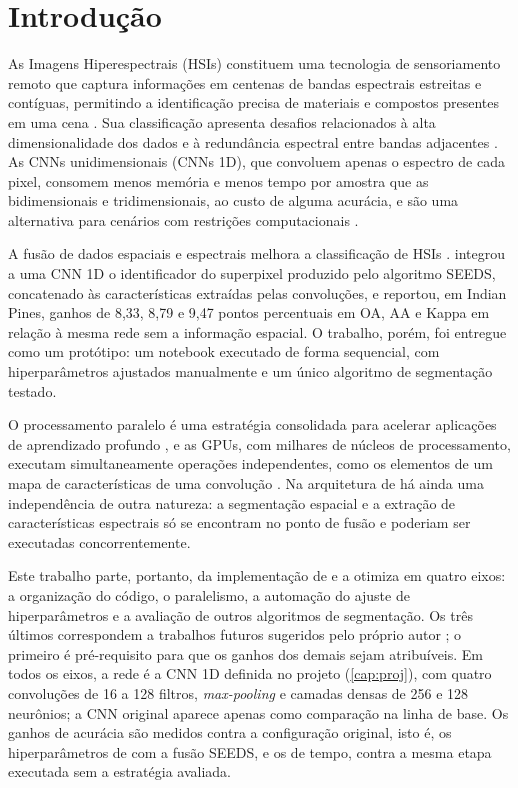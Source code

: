 \chapter{Introdução}
\label{cap:intro}

As Imagens Hiperespectrais (HSIs) constituem uma tecnologia de sensoriamento remoto que captura informações em centenas de bandas espectrais estreitas e contíguas, permitindo a identificação precisa de materiais e compostos presentes em uma cena \cite{Li2019DeepLF, Ahmad_2025}. Sua classificação apresenta desafios relacionados à alta dimensionalidade dos dados e à redundância espectral entre bandas adjacentes \cite{Qian2020, Lurs12162659}. As CNNs unidimensionais (CNNs 1D), que convoluem apenas o espectro de cada pixel, consomem menos memória e menos tempo por amostra que as bidimensionais e tridimensionais, ao custo de alguma acurácia, e são uma alternativa para cenários com restrições computacionais \cite{Viel10064297}.

A fusão de dados espaciais e espectrais melhora a classificação de HSIs \cite{IMANI202059, Souza2023}.  integrou a uma CNN 1D o identificador do superpixel produzido pelo algoritmo SEEDS, concatenado às características extraídas pelas convoluções, e reportou, em Indian Pines, ganhos de 8,33, 8,79 e 9,47 pontos percentuais em OA, AA e Kappa em relação à mesma rede sem a informação espacial. O trabalho, porém, foi entregue como um protótipo: um notebook executado de forma sequencial, com hiperparâmetros ajustados manualmente e um único algoritmo de segmentação testado.

O processamento paralelo é uma estratégia consolidada para acelerar aplicações de aprendizado profundo \cite{Aach2025, Nandan10910577}, e as GPUs, com milhares de núcleos de processamento, executam simultaneamente operações independentes, como os elementos de um mapa de características de uma convolução \cite{CUDA_Programming, Jorda_cuDNN}. Na arquitetura de  há ainda uma independência de outra natureza: a segmentação espacial e a extração de características espectrais só se encontram no ponto de fusão e poderiam ser executadas concorrentemente.

Este trabalho parte, portanto, da implementação de  e a otimiza em quatro eixos: a organização do código, o paralelismo, a automação do ajuste de hiperparâmetros e a avaliação de outros algoritmos de segmentação. Os três últimos correspondem a trabalhos futuros sugeridos pelo próprio autor \cite{Souza2023}; o primeiro é pré-requisito para que os ganhos dos demais sejam atribuíveis. Em todos os eixos, a rede é a CNN 1D definida no projeto (\autoref{cap:proj}), com quatro convoluções de 16 a 128 filtros, \textit{max-pooling} e camadas densas de 256 e 128 neurônios; a CNN original aparece apenas como comparação na linha de base. Os ganhos de acurácia são medidos contra a configuração original, isto é, os hiperparâmetros de  com a fusão SEEDS, e os de tempo, contra a mesma etapa executada sem a estratégia avaliada.

